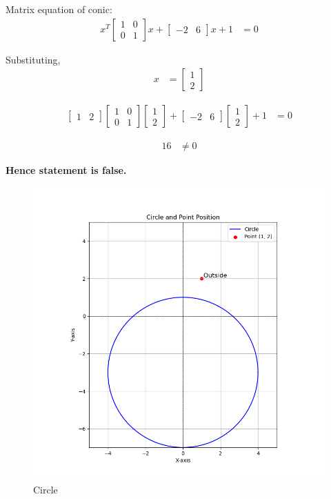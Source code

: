 \documentclass[journal]{IEEEtran}
\begin{document}
Matrix equation of conic:
\begin{align}
x^T 
\begin{bmatrix}
1 & 0 \\
0 & 1
\end{bmatrix}
x + 
\begin{bmatrix}
-2 & 6
\end{bmatrix}
x + 1 &= 0
\end{align}

Substituting,
\begin{align}
x &= 
\begin{bmatrix}
1 \\
2
\end{bmatrix}
\end{align}

\begin{align}
\begin{bmatrix}
1 & 2
\end{bmatrix}
\begin{bmatrix}
1 & 0 \\
0 & 1
\end{bmatrix}
\begin{bmatrix}
1 \\
2
\end{bmatrix}
+ 
\begin{bmatrix}
-2 & 6
\end{bmatrix}
\begin{bmatrix}
1 \\
2
\end{bmatrix}
+ 1 &= 0
\end{align}

\begin{align}
16 &\neq 0
\end{align}

\textbf{Hence statement is false.}

\begin{figure}[h!]
	\centering
	\includegraphics[width=0.7\linewidth]{figure/Figure_1.png}
	\caption{Circle}
\end{figure}
\end{document}
